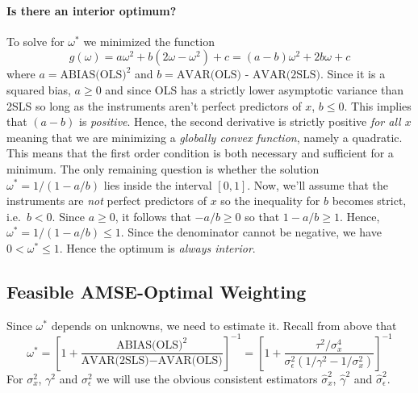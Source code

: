 \documentclass[12pt]{article}
\theoremstyle{definition}
\begin{document}
\paragraph{Is there an interior optimum?} To solve for $\omega^*$ we minimized the function 
    $$g(\omega) = a\omega^2 + b(2\omega - \omega^2) + c = (a - b)\omega^2 + 2b\omega + c$$ 
where $a = \mbox{ABIAS(OLS)}^2$ and $b = \mbox{AVAR(OLS) - AVAR(2SLS)}$. Since it is a squared bias, $a \geq 0$ and since OLS has a strictly lower asymptotic variance than 2SLS so long as the instruments aren't perfect predictors of $x$, $b \leq 0$. This implies that $(a - b)$ is \emph{positive}. Hence, the second derivative is strictly positive \emph{for all $x$} meaning that we are minimizing a \emph{globally convex function}, namely a quadratic. This means that the first order condition is both necessary and sufficient for a minimum. The only remaining question is whether the solution $\omega^* = 1/(1 - a/b)$ lies inside the interval $[0,1]$. Now, we'll assume that the instruments are \emph{not} perfect predictors of $x$ so the inequality for $b$ becomes strict, i.e.\ $b < 0$. Since $a \geq 0$, it follows that $-a/b \geq 0$ so that $1 - a/b \geq 1$. Hence,
$\omega^* = 1/(1 - a/b) \leq 1$. Since the denominator cannot be negative, we have $0 < \omega^* \leq 1$. Hence the optimum is \emph{always interior}.
 



\subsection{Feasible AMSE-Optimal Weighting} %
\label{sub:feasible_amse_optimal_weighting}
Since $\omega^*$ depends on unknowns, we need to estimate it. Recall from above that
  $$\omega^* = \left[1 + \frac{\mbox{ABIAS(OLS)}^2}{\mbox{AVAR(2SLS)}-\mbox{AVAR(OLS)}} \right]^{-1} = \left[1 + \frac{\tau^2/\sigma_x^4}{\sigma_\epsilon^2 (1/\gamma^2 - 1/\sigma_x^2)}\right]^{-1}$$ 
For $\sigma_x^2$, $\gamma^2$ and $\sigma_\epsilon^2$ we will use the obvious consistent estimators $\widehat{\sigma}_x^2$, $\widehat{\gamma}^2$ and $\widehat{\sigma}_\epsilon^2$. 
\end{document}

